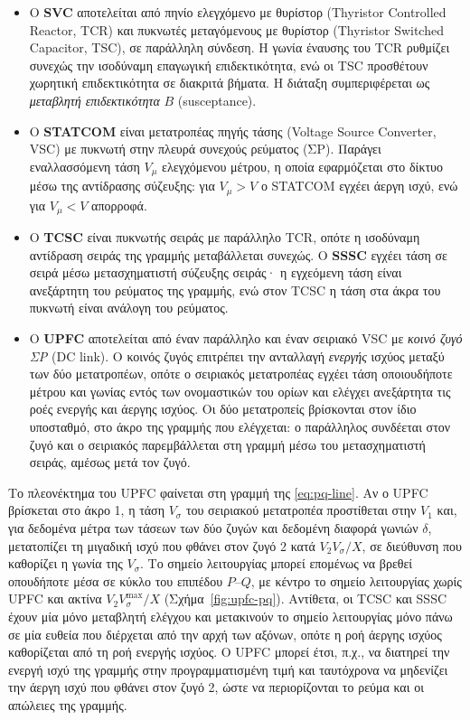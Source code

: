 \begin{itemize}
\item Ο \textbf{SVC} αποτελείται από πηνίο ελεγχόμενο με θυρίστορ (Thyristor Controlled
      Reactor, TCR) και πυκνωτές μεταγόμενους με θυρίστορ (Thyristor Switched Capacitor,
      TSC), σε παράλληλη σύνδεση. Η γωνία έναυσης του TCR ρυθμίζει συνεχώς την ισοδύναμη
      επαγωγική επιδεκτικότητα, ενώ οι TSC προσθέτουν χωρητική επιδεκτικότητα σε διακριτά
      βήματα. Η διάταξη συμπεριφέρεται ως \emph{μεταβλητή επιδεκτικότητα} $B$ (susceptance).
\item Ο \textbf{STATCOM} είναι μετατροπέας πηγής τάσης (Voltage Source Converter, VSC) με
      πυκνωτή στην πλευρά συνεχούς ρεύματος (ΣΡ). Παράγει εναλλασσόμενη τάση $V_\mu$
      ελεγχόμενου μέτρου, η οποία εφαρμόζεται στο δίκτυο μέσω της αντίδρασης σύζευξης: για
      $V_\mu > V$ ο STATCOM εγχέει άεργη ισχύ, ενώ για $V_\mu < V$ απορροφά.
\item Ο \textbf{TCSC} είναι πυκνωτής σειράς με παράλληλο TCR, οπότε η ισοδύναμη αντίδραση
      σειράς της γραμμής μεταβάλλεται συνεχώς. Ο \textbf{SSSC} εγχέει τάση σε σειρά μέσω
      μετασχηματιστή σύζευξης σειράς· η εγχεόμενη τάση είναι ανεξάρτητη του ρεύματος της
      γραμμής, ενώ στον TCSC η τάση στα άκρα του πυκνωτή είναι ανάλογη του ρεύματος.
\item Ο \textbf{UPFC} αποτελείται από έναν παράλληλο και έναν σειριακό VSC με \emph{κοινό
      ζυγό ΣΡ} (DC link). Ο κοινός ζυγός επιτρέπει την ανταλλαγή \emph{ενεργής} ισχύος
      μεταξύ των δύο μετατροπέων, οπότε ο σειριακός μετατροπέας εγχέει τάση οποιουδήποτε
      μέτρου και γωνίας εντός των ονομαστικών του ορίων και ελέγχει ανεξάρτητα τις ροές
      ενεργής και άεργης ισχύος. Οι δύο μετατροπείς βρίσκονται στον ίδιο υποσταθμό, στο άκρο
      της γραμμής που ελέγχεται: ο παράλληλος συνδέεται στον ζυγό και ο σειριακός
      παρεμβάλλεται στη γραμμή μέσω του μετασχηματιστή σειράς, αμέσως μετά τον ζυγό.
\end{itemize}

Το πλεονέκτημα του UPFC φαίνεται στη γραμμή της \eqref{eq:pq-line}. Αν ο UPFC βρίσκεται στο
άκρο 1, η τάση $V_\sigma$ του σειριακού μετατροπέα προστίθεται στην $V_1$ και, για δεδομένα μέτρα
των τάσεων των δύο ζυγών και δεδομένη διαφορά γωνιών $\delta$, μετατοπίζει τη μιγαδική ισχύ
που φθάνει στον ζυγό 2 κατά $V_2 V_\sigma/X$, σε διεύθυνση που καθορίζει η γωνία της $V_\sigma$. Το
σημείο λειτουργίας μπορεί επομένως να βρεθεί οπουδήποτε μέσα σε κύκλο του επιπέδου $P$--$Q$, με κέντρο το σημείο
λειτουργίας χωρίς UPFC και ακτίνα $V_2 V_\sigma^{\max}/X$ (Σχήμα~\ref{fig:upfc-pq}).
Αντίθετα, οι TCSC και SSSC έχουν μία μόνο μεταβλητή ελέγχου και μετακινούν το σημείο
λειτουργίας μόνο πάνω σε μία ευθεία που διέρχεται από την αρχή των αξόνων, οπότε η ροή άεργης
ισχύος καθορίζεται από τη ροή ενεργής ισχύος. Ο UPFC μπορεί έτσι, π.χ., να
διατηρεί την ενεργή ισχύ της γραμμής στην προγραμματισμένη τιμή και ταυτόχρονα να μηδενίζει
την άεργη ισχύ που φθάνει στον ζυγό 2, ώστε να περιορίζονται το ρεύμα και οι απώλειες της
γραμμής.

